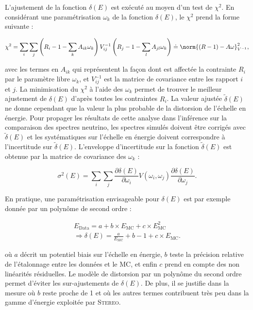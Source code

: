  L'ajustement de la fonction $\delta(E)$ est exécuté au moyen d'un test de $\chi^2$. En considérant une paramétrisation $\omega_k$ de la fonction $\delta(E)$, le $\chi^2$ prend la forme suivante :

\begin{equation}
    \chi^2 = \sum_i \sum_j \left( R_i - 1 - \sum_k A_{ik}\omega_k \right) V_{ij}^{-1} \left( R_j - 1 - \sum_l A_{jl}\omega_k \right) \doteq \norm{\left(R - 1\right) - A\omega}^2_{V^{-1}},
\end{equation}

\bigbreak

avec les termes en $A_{ik}$ qui représentent la façon dont est affectée la contrainte $R_i$ par le paramètre libre $\omega_k$, et $V_{ij}^{-1}$ est la matrice de covariance entre les rapport $i$ et $j$. La minimisation du $\chi^2$ à l'aide des $\omega_k$ permet de trouver le meilleur ajustement de $\delta(E)$ d'après toutes les contraintes $R_i$. La valeur ajustée $\widetilde{\delta}(E)$ ne donne cependant que la valeur la plus probable de la distorsion de l'échelle en énergie. Pour propager les résultats de cette analyse dans l'inférence sur la comparaison des spectres neutrino, les spectres simulés doivent être corrigés avec $\widetilde{\delta}(E)$ et les systématiques sur l'échelle en énergie doivent correspondre à l'incertitude sur $\widetilde{\delta}(E)$. L'enveloppe d'incertitude sur la fonction $\widetilde{\delta}(E)$ est obtenue par la matrice de covariance des $\omega_k$ :

\begin{equation}
    \sigma^2(E) = \sum_i\sum_j \frac{\partial \delta(E)}{\partial \omega_i} V(\omega_i, \omega_j) \frac{\partial \delta(E)}{\partial \omega_j}.
\end{equation}

\bigbreak

En pratique, une paramétrisation envisageable pour $\delta(E)$ est par exemple donnée par un polynôme de second ordre :

\begin{equation}
\begin{gathered}
    E_\textrm{Data} = a + b \times E_\textrm{MC} + c \times E_\textrm{MC}^2 \\
    \Rightarrow \delta(E) = \frac{a}{E_\textrm{MC}} + b - 1 + c\times E_\textrm{MC}.
\end{gathered}
\end{equation}

\bigbreak

où $a$ décrit un potentiel biais sur l'échelle en énergie, $b$ teste la précision relative de l'étalonnage entre les données et le MC, et enfin $c$ prend en compte des non linéarités résiduelles. Le modèle de distorsion par un polynôme du second ordre permet d'éviter les sur-ajustements de $\delta(E)$. De plus, il se justifie dans la mesure où $b$ reste proche de 1 et où les autres termes contribuent très peu dans la gamme d'énergie exploitée par \textsc{Stereo}.  

